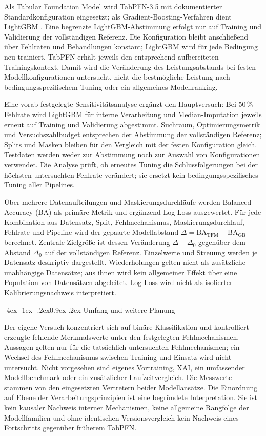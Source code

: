 \documentclass[12pt,a4paper]{article}
\makeatletter
\renewcommand\section{\@startsection{section}{1}{\z@}%
  {-4ex \@plus -1ex \@minus -.2ex}{0.9ex \@plus .2ex}%
  {\normalfont\Large\bfseries}}
\makeatother
\begin{document}
Als Tabular Foundation Model wird TabPFN-3.5 mit dokumentierter
Standardkonfiguration eingesetzt; als Gradient-Boosting-Verfahren dient
LightGBM \cite{ke2017lightgbm}.
Eine begrenzte LightGBM-Abstimmung erfolgt nur auf Training und
Validierung der vollständigen Referenz. Die Konfiguration bleibt
anschließend über Fehlraten und Behandlungen konstant; LightGBM wird
für jede Bedingung neu trainiert. TabPFN erhält jeweils den entsprechend
aufbereiteten Trainingskontext. Damit wird die Veränderung des
Leistungsabstands bei festen Modellkonfigurationen untersucht, nicht
die bestmögliche Leistung nach bedingungsspezifischem Tuning oder ein
allgemeines Modellranking.

Eine vorab festgelegte Sensitivitätsanalyse ergänzt den Hauptversuch:
Bei 50\,\% Fehlrate wird LightGBM für interne Verarbeitung und
Median-Imputation jeweils erneut auf Training und Validierung
abgestimmt. Suchraum, Optimierungsmetrik und Versuchszahlbudget
entsprechen der Abstimmung der vollständigen Referenz; Splits und
Masken bleiben für den Vergleich mit der festen Konfiguration gleich.
Testdaten werden weder zur Abstimmung noch zur Auswahl von
Konfigurationen verwendet. Die Analyse prüft, ob erneutes Tuning die
Schlussfolgerungen bei der höchsten untersuchten Fehlrate verändert;
sie ersetzt kein bedingungsspezifisches Tuning aller Pipelines.

Über mehrere Datenaufteilungen und Maskierungsdurchläufe werden
Balanced Accuracy (BA) als primäre Metrik und ergänzend Log-Loss
ausgewertet. Für jede Kombination aus Datensatz, Split,
Fehlmechanismus, Maskierungsdurchlauf, Fehlrate und Pipeline wird der
gepaarte Modellabstand
$\Delta=\mathrm{BA}_{\mathrm{TFM}}-\mathrm{BA}_{\mathrm{GB}}$
berechnet. Zentrale Zielgröße ist dessen Veränderung
$\Delta-\Delta_0$ gegenüber dem Abstand $\Delta_0$ auf der
vollständigen Referenz. Einzelwerte und Streuung werden je Datensatz
deskriptiv dargestellt. Wiederholungen gelten nicht als zusätzliche
unabhängige Datensätze; aus ihnen wird kein allgemeiner Effekt über
eine Population von Datensätzen abgeleitet. Log-Loss wird nicht als
isolierter Kalibrierungsnachweis interpretiert.

\section{Umfang und weitere Planung}

Der eigene Versuch konzentriert sich auf binäre Klassifikation und
kontrolliert erzeugte fehlende Merkmalswerte unter den festgelegten
Fehlmechanismen. Aussagen gelten nur für die tatsächlich untersuchten
Fehlmechanismen; ein Wechsel des Fehlmechanismus zwischen Training
und Einsatz wird nicht untersucht. Nicht vorgesehen sind eigenes
Vortraining, XAI, ein umfassender Modellbenchmark oder ein
zusätzlicher Laufzeitvergleich. Die Messwerte stammen von den
eingesetzten Vertretern beider Modellansätze. Die Einordnung auf
Ebene der Verarbeitungsprinzipien ist eine begründete Interpretation.
Sie ist kein kausaler Nachweis interner Mechanismen, keine allgemeine
Rangfolge der Modellfamilien und ohne identischen Versionsvergleich
kein Nachweis eines Fortschritts gegenüber früherem TabPFN.
\end{document}
